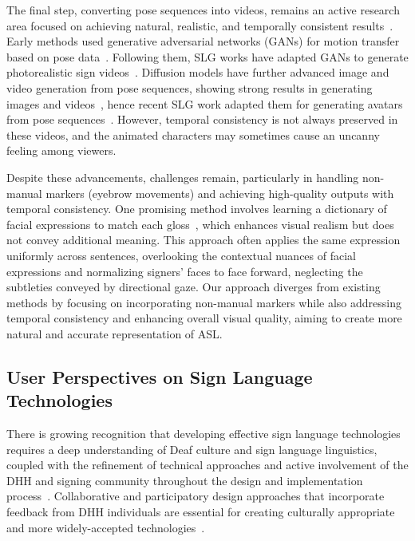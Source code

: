 The final step, converting pose sequences into videos, remains an active research area focused on achieving natural, realistic, and temporally consistent results~\cite{chan2019everybody, aberman2019deep, liu2019neural, wang2018video, hu2024animate, wang2024disco}. Early methods used generative adversarial networks (GANs) for motion transfer based on pose data~\cite{chan2019everybody, aberman2019deep, liu2019neural, wang2018video}. Following them, SLG works have adapted GANs to generate photorealistic sign videos~\cite{saunders_signing_2022, walsh_sign_2024}. Diffusion models have further advanced image and video generation from pose sequences, showing strong results in generating images and videos~\cite{ramesh2022hierarchical, saharia2022photorealistic, zhang2023adding, huang2023composer, mou2024t2i, hu2024animate, feng2023dreamoving}, hence recent SLG work adapted them for generating avatars from pose sequences~\cite{fang2023signdiff, fang2024signllm}. However, temporal consistency is not always preserved in these videos, and the animated characters may sometimes cause an uncanny feeling among viewers.

Despite these advancements, challenges remain, particularly in handling non-manual markers (\eg eyebrow movements) and achieving high-quality outputs with temporal consistency. One promising method involves learning a dictionary of facial expressions to match each gloss~\cite{walsh_sign_2024}, which enhances visual realism but does not convey additional meaning. This approach often applies the same expression uniformly across sentences, overlooking the contextual nuances of facial expressions and normalizing signers’ faces to face forward, neglecting the subtleties conveyed by directional gaze. Our approach diverges from existing methods by focusing on incorporating non-manual markers while also addressing temporal consistency and enhancing overall visual quality, aiming to create more natural and accurate representation of ASL.

\subsection{User Perspectives on Sign Language Technologies}\label{subsec:rw_user_perspectives}

There is growing recognition that developing effective sign language technologies requires a deep understanding of Deaf culture and sign language linguistics, coupled with the refinement of technical approaches and active involvement of the DHH and signing community throughout the design and implementation process~\cite{prietch_systematic_2022,desai2024systemic,kipp2011assessing}. Collaborative and participatory design approaches that incorporate feedback from DHH individuals are essential for creating culturally appropriate and more widely-accepted technologies~\cite{bragg_sign_2019}.

